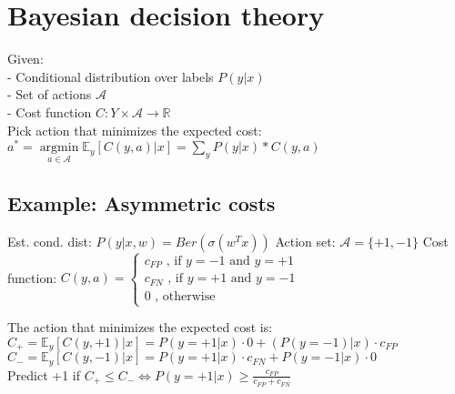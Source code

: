 \section*{Bayesian decision theory}
Given:\\
- Conditional distribution over labels $P(y|x)$\\
- Set of actions $\mathcal{A}$\\
- Cost function $C:Y\times \mathcal{A} \rightarrow \mathbb{R}$\\
Pick action that minimizes the expected cost:
$a^* = \underset{a \in \mathcal{A}}{\operatorname{argmin}} \mathbb{E}_y[C(y,a)|x] = \sum_y P(y|x) * C(y,a)$ 


\subsection*{Example: Asymmetric costs}
\begin{itemize}
	 Est. cond. dist: $P(y|x,w) = Ber(\sigma(w^Tx))$
	 Action set: $\mathcal{A} = \{ +1, -1\}$
	 Cost function: $C(y,a) = \left \{ 
		\begin{array}{lr}
			c_{FP} \text{ , if $y=-1$ and $y=+1$}\\
			c_{FN} \text{ , if $y=+1$ and $y=-1$}\\
			0 \text{ , otherwise}
		\end{array}
		$
\end{itemize}
The action that minimizes the expected cost is:\\
$C_+ = \mathbb{E}_y[C(y,+1)|x] = P(y=+1|x) \cdot 0 + (P(y=-1)|x) \cdot c_{FP}$\\
$C_- = \mathbb{E}_y[C(y,-1)|x] = P(y=+1|x) \cdot c_{FN} + P(y=-1|x) \cdot 0$\\
Predict +1 if $C_+ \leq C_- \Leftrightarrow P(y=+1|x) \geq \frac{c_{FP}}{c_{FP} + c_{FN}}$

